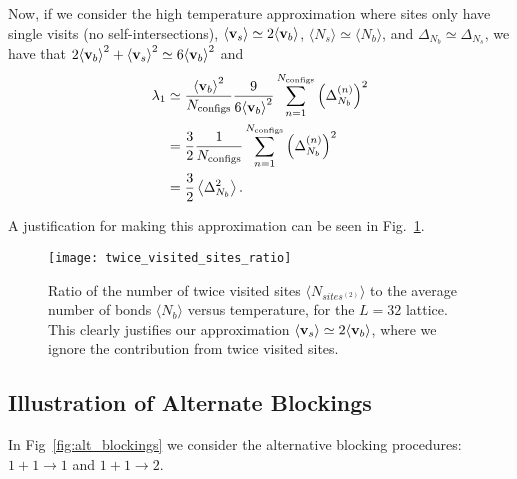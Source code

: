 \documentclass[../main.tex]{subfiles}
\begin{document}
Now, if we consider the high temperature approximation where sites only have
single visits (no self-intersections), ${\langle \mathbf{v}_s\rangle} \simeq 2{\langle \mathbf{v}_b\rangle}$, $\langle
N_s\rangle \simeq \langle N_b\rangle$, and $\Delta_{N_b} \simeq \Delta_{N_s}$,
we have that $2{\langle \mathbf{v}_b\rangle}^2 + {\langle \mathbf{v}_s\rangle}^2 \simeq 6{\langle \mathbf{v}_b\rangle}^2$ and
%
%
\begin{align}
    \lambda_1 &\simeq \frac{{\langle \mathbf{v}_b\rangle}^2}{N_{\mathrm{configs}}}\frac{9}{6{\langle \mathbf{v}_b\rangle}^2}
    \sum_{n=1}^{N_{\mathrm{configs}}} {\left(\Delta_{N_b}^{(n)}\right)}^2 \\
    &= \frac{3}{2}\frac{1}{N_{\mathrm{configs}}}\sum_{n=1}^{N_{\mathrm{configs}}}
    {\left(\Delta_{N_b}^{(n)}\right)}^2 \\
    &= \frac{3}{2}\left \langle \Delta_{N_b}^2 \right\rangle.
    \label{eq:eigval_delta_Nb2}
\end{align}
%

A justification for making this approximation can be seen in
Fig.~\ref{fig:twice_visited_sites_ratio}. 
%
%
\begin{figure}[htpb]
  \centering
  \texttt{[image: twice\_visited\_sites\_ratio]}
  \caption{Ratio of the number of twice visited sites $\langle
    N_{sites^{(2)}}\rangle$ to the average number of bonds $\langle N_b\rangle$
    versus temperature, for the $L=32$ lattice. This clearly justifies our
    approximation ${\langle \mathbf{v}_s\rangle} \simeq 2{\langle \mathbf{v}_b\rangle}$, where we ignore the contribution
  from twice visited sites.}%
\label{fig:twice_visited_sites_ratio}
\end{figure}
%
%

\subsection{Illustration of Alternate Blockings}%
\label{subsec:altb}
In Fig~\ref{fig:alt_blockings} we consider the alternative blocking procedures:
$1 + 1 \rightarrow 1$ and $1 + 1 \rightarrow 2$.
%
\end{document}
